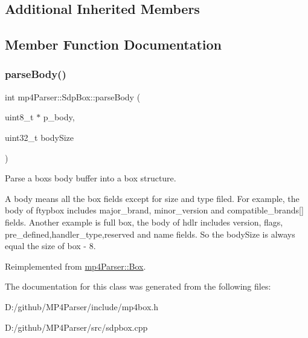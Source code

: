 \subsection*{Additional Inherited Members}


\subsection{Member Function Documentation}
\mbox{\label{classmp4_parser_1_1_sdp_box_a73c6c78702a8f6032bef5d6f1d703090}} 
\subsubsection{\texorpdfstring{parseBody()}{parseBody()}}
{\footnotesize\ttfamily int mp4\+Parser\+::\+Sdp\+Box\+::parse\+Body (\begin{DoxyParamCaption}\item[{uint8\+\_\+t $\ast$}]{p\+\_\+body,  }\item[{uint32\+\_\+t}]{body\+Size }\end{DoxyParamCaption})\hspace{0.3cm}{\ttfamily [virtual]}}



Parse a box\textquotesingle{}s body buffer into a box structure. 

A body means all the box fields except for size and type filed. For example, the body of ftypbox includes major\+\_\+brand, minor\+\_\+version and compatible\+\_\+brands\mbox{[}\mbox{]} fields. Another example is full box, the body of hdlr includes version, flags, pre\+\_\+defined,handler\+\_\+type,reserved and name fields. So the body\+Size is always equal the size of box -\/ 8. 

Reimplemented from \mbox{\hyperlink{classmp4_parser_1_1_box_a3dd0c084ac65bc77b69ac5ecaf796cb2}{mp4\+Parser\+::\+Box}}.



The documentation for this class was generated from the following files\+:\begin{DoxyCompactItemize}
\item 
D\+:/github/\+M\+P4\+Parser/include/mp4box.\+h\item 
D\+:/github/\+M\+P4\+Parser/src/sdpbox.\+cpp\end{DoxyCompactItemize}
